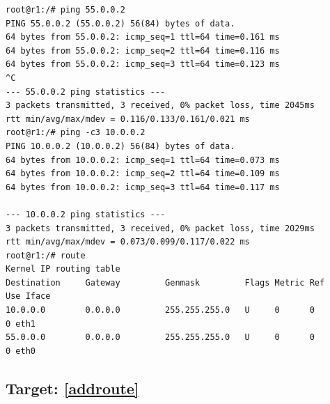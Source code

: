 \documentclass[12pt]{book}
\begin{document}
\begin{enumerate}[label=Activity \arabic*:]
  \begin{lstlisting}
root@r1:/# ping 55.0.0.2
PING 55.0.0.2 (55.0.0.2) 56(84) bytes of data.
64 bytes from 55.0.0.2: icmp_seq=1 ttl=64 time=0.161 ms
64 bytes from 55.0.0.2: icmp_seq=2 ttl=64 time=0.116 ms
64 bytes from 55.0.0.2: icmp_seq=3 ttl=64 time=0.123 ms
^C
--- 55.0.0.2 ping statistics ---
3 packets transmitted, 3 received, 0% packet loss, time 2045ms
rtt min/avg/max/mdev = 0.116/0.133/0.161/0.021 ms
root@r1:/# ping -c3 10.0.0.2
PING 10.0.0.2 (10.0.0.2) 56(84) bytes of data.
64 bytes from 10.0.0.2: icmp_seq=1 ttl=64 time=0.073 ms
64 bytes from 10.0.0.2: icmp_seq=2 ttl=64 time=0.109 ms
64 bytes from 10.0.0.2: icmp_seq=3 ttl=64 time=0.117 ms

--- 10.0.0.2 ping statistics ---
3 packets transmitted, 3 received, 0% packet loss, time 2029ms
rtt min/avg/max/mdev = 0.073/0.099/0.117/0.022 ms
root@r1:/# route
Kernel IP routing table
Destination     Gateway         Genmask         Flags Metric Ref    Use Iface
10.0.0.0        0.0.0.0         255.255.255.0   U     0      0        0 eth1
55.0.0.0        0.0.0.0         255.255.255.0   U     0      0        0 eth0
  \end{lstlisting}
\end{enumerate}


\subsection{Target: \ref{addroute}}\label{route.ipv4.3.se}
\end{document}
